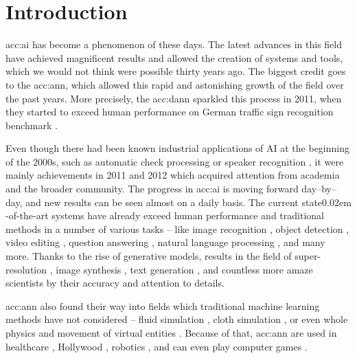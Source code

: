 \chapter{Introduction}
\label{chap:intro}

\acrfull{acc:ai} has become a phenomenon of these days. The latest advances in this field have achieved magnificent results and allowed the creation of systems and tools, which we would not think were possible thirty years ago. The biggest credit goes to the \acrfull{acc:ann}, which allowed this rapid and astonishing growth of the field over the past years. More precisely, the \acrfull{acc:dann} sparkled this process in 2011, when they started to exceed human performance on German traffic sign recognition benchmark \citep{CIRESAN2012333}.

Even though there had been known industrial applications of AI at the beginning of the 2000s, such as automatic check processing \citep{ChecksDocumentRecognition} or speaker recognition \citep{HECK2000181}, it were mainly achievements in 2011 and 2012 which acquired attention from academia and the broader community. The progress in \acrshort{acc:ai} is moving forward day--by--day, and new results can be seen almost on a daily basis. The current state\kern0.02em -of-the-art systems have already exceed human performance and traditional methods in a number of various tasks -- like 
image recognition \citep{pham2021meta}\citep{ZawadzkaGosk2019},
object detection \citep{ghiasi2020simple}\citep{lehner2019patch},
video editing \citep{lu2020layered},
question answering \citep{zhang2020pushing}\citep{yamada2020luke},
natural language processing \citep{gpt3},
and many more. Thanks to the rise of generative models, results in the field of
super-resolution \citep{Sun_2020}\allowbreak\citep{Chadha_2020},
image synthesis \citep{StateOfTheArtImageSythesis}\allowbreak\citep{esser2020taming}\allowbreak\citep{dalle},
text generation \citep{gpt3}\allowbreak\citep{malmi2019encode},
and countless more amaze scientists by their accuracy and attention to details.

\acrshort{acc:ann} also found their way into fields which traditional machine learning methods have not considered -- fluid simulation \citep{um2018liquid}\citep{Kim_2019}, cloth simulation \citep{lee2019efficient}\citep{SRBO20}, or even whole physics \citep{PhysicsSimulation}\citep{sanchezgonzalez2020learning} and movement of virtual entities \citep{PhysicsBasedCharaterSImulation}\citep{zhang2020vid2player}. Because of that, \acrshort{acc:ann} are used in 
healthcare \citep{fakoor2013using}\allowbreak\citep{BreastCancerAISystem},
Hollywood \citep{aiinhollywood},
robotics \citep{pierson2017deep}\allowbreak\citep{Lee_2020},
and can even play computer games \citep{openai2019dota}\allowbreak\citep{alphastar}.

